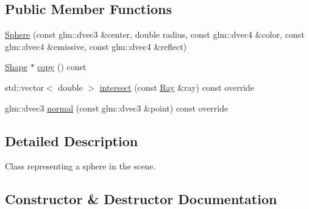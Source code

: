 \subsection*{Public Member Functions}
\begin{DoxyCompactItemize}
\item 
\hyperlink{class_sphere_a4e8ff9197b7acbecd4b1f40106ebd2cf}{Sphere} (const glm\+::dvec3 \&center, double radius, const glm\+::dvec4 \&color, const glm\+::dvec4 \&emissive, const glm\+::dvec4 \&reflect)
\item 
\hyperlink{class_shape}{Shape} $\ast$ \hyperlink{class_sphere_a4510f5adf2bbee77129764097ef48d8a}{copy} () const 
\item 
std\+::vector$<$ double $>$ \hyperlink{class_sphere_afbd74bde6764fe9a037a86c2b38f1fce}{intersect} (const \hyperlink{class_ray}{Ray} \&ray) const override
\item 
glm\+::dvec3 \hyperlink{class_sphere_a9ee72459ad76bddcc1dfb308991b33ee}{normal} (const glm\+::dvec3 \&point) const override
\end{DoxyCompactItemize}


\subsection{Detailed Description}
Class representing a sphere in the scene. 

\subsection{Constructor \& Destructor Documentation}

